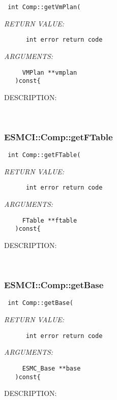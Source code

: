   
\begin{verbatim} int Comp::getVmPlan(\end{verbatim}{\em RETURN VALUE:}
\begin{verbatim}      int error return code\end{verbatim}{\em ARGUMENTS:}
\begin{verbatim}     VMPlan **vmplan
   )const{\end{verbatim}
{\sf DESCRIPTION:\\ }


   
 
\mbox{}\hrulefill\
 
\subsubsection [ESMCI::Comp::getFTable] {ESMCI::Comp::getFTable}


  
\begin{verbatim} int Comp::getFTable(\end{verbatim}{\em RETURN VALUE:}
\begin{verbatim}      int error return code\end{verbatim}{\em ARGUMENTS:}
\begin{verbatim}     FTable **ftable
   )const{\end{verbatim}
{\sf DESCRIPTION:\\ }


   
 
\mbox{}\hrulefill\
 
\subsubsection [ESMCI::Comp::getBase] {ESMCI::Comp::getBase}


  
\begin{verbatim} int Comp::getBase(\end{verbatim}{\em RETURN VALUE:}
\begin{verbatim}      int error return code\end{verbatim}{\em ARGUMENTS:}
\begin{verbatim}     ESMC_Base **base
   )const{\end{verbatim}
{\sf DESCRIPTION:\\ }


